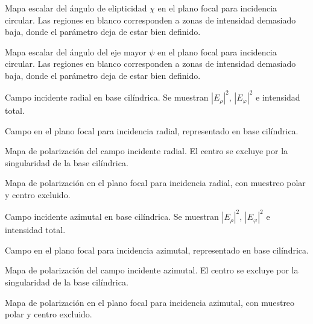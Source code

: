 \caption{Mapa escalar del ángulo de elipticidad $\chi$ en el plano focal para incidencia circular. Las regiones en blanco corresponden a zonas de intensidad demasiado baja, donde el parámetro deja de estar bien definido.}
\label{fig:circular-plano-focal-elipticidad}

\caption{Mapa escalar del ángulo del eje mayor $\psi$ en el plano focal para incidencia circular. Las regiones en blanco corresponden a zonas de intensidad demasiado baja, donde el parámetro deja de estar bien definido.}
\label{fig:circular-plano-focal-psi}

\caption{Campo incidente radial en base cilíndrica. Se muestran $|E_\rho|^2$, $|E_\varphi|^2$ e intensidad total.}
\label{fig:radial-incidente-componentes}

\caption{Campo en el plano focal para incidencia radial, representado en base cilíndrica.}
\label{fig:radial-plano-focal-componentes}

\caption{Mapa de polarización del campo incidente radial. El centro se excluye por la singularidad de la base cilíndrica.}
\label{fig:radial-incidente-mapa-polarizacion}

\caption{Mapa de polarización en el plano focal para incidencia radial, con muestreo polar y centro excluido.}
\label{fig:radial-plano-focal-mapa-polarizacion}

\caption{Campo incidente azimutal en base cilíndrica. Se muestran $|E_\rho|^2$, $|E_\varphi|^2$ e intensidad total.}
\label{fig:azimutal-incidente-componentes}

\caption{Campo en el plano focal para incidencia azimutal, representado en base cilíndrica.}
\label{fig:azimutal-plano-focal-componentes}

\caption{Mapa de polarización del campo incidente azimutal. El centro se excluye por la singularidad de la base cilíndrica.}
\label{fig:azimutal-incidente-mapa-polarizacion}

\caption{Mapa de polarización en el plano focal para incidencia azimutal, con muestreo polar y centro excluido.}
\label{fig:azimutal-plano-focal-mapa-polarizacion}
